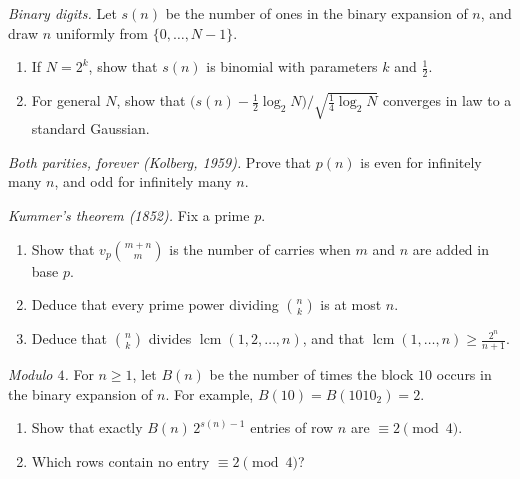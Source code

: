 \begin{exercise}[$\star\star$]\label{pb:digitsclt}
\emph{Binary digits.} Let $s(n)$ be the number of ones in the binary expansion of $n$, and draw $n$ uniformly from $\{0,\dots,N-1\}$.
\begin{enumerate}[label=(\alph*)]
\item If $N=2^k$, show that $s(n)$ is binomial with parameters $k$ and $\frac12$.
\item For general $N$, show that $\bigl(s(n)-\frac12\log_2N\bigr)/\sqrt{\frac14\log_2N}$ converges in law to a standard Gaussian.
\end{enumerate}
\end{exercise}

\begin{exercise}[$\star\star$]\label{pb:kolberg}
\emph{Both parities, forever (Kolberg, 1959).} Prove that $p(n)$ is even for infinitely many $n$, and odd for infinitely many $n$.
\end{exercise}

\begin{exercise}[$\star\star$]\label{pb:kummer}
\emph{Kummer's theorem (1852).} Fix a prime $p$.
\begin{enumerate}[label=(\alph*)]
\item Show that $v_p\binom{m+n}m$ is the number of carries when $m$ and $n$ are added in base $p$.
\item Deduce that every prime power dividing $\binom nk$ is at most $n$.
\item Deduce that $\binom nk$ divides $\operatorname{lcm}(1,2,\dots,n)$, and that $\operatorname{lcm}(1,\dots,n)\ge\frac{2^n}{n+1}$.
\end{enumerate}
\end{exercise}

\begin{exercise}[$\star\star$]\label{pb:pascalfour}
\emph{Modulo $4$.} For $n\ge1$, let $B(n)$ be the number of times the block $10$ occurs in the binary expansion of $n$. For example, $B(10)=B(1010_2)=2$.
\begin{enumerate}[label=(\alph*)]
\item Show that exactly $B(n)\,2^{s(n)-1}$ entries of row $n$ are $\equiv2\pmod4$.
\item Which rows contain no entry $\equiv2\pmod4$?
\end{enumerate}
\end{exercise}


